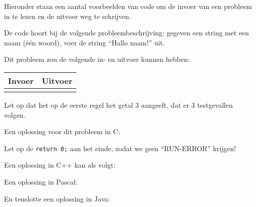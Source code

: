 \documentclass[11pt,titlepage,a4paper]{article}
\begin{document}
Hieronder staan een aantal voorbeelden van code om de invoer van een
probleem in te lezen en de uitvoer weg te schrijven.

De code hoort bij de volgende probleembeschrijving: gegeven een string
met een naam (\'e\'en woord), voer de string ``Hallo naam!'' uit.

Dit probleem zou de volgende in- en uitvoer kunnen hebben:

\begin{tabular}{|p{}|p{}|}
\hline
\textbf{Invoer} & \textbf{Uitvoer} \\
\hline
 &
 \\
\hline
\end{tabular}

Let op dat het op de eerste regel het getal 3 aangeeft, dat er 3
testgevallen volgen.

Een oplossing voor dit probleem in C:


Let op de \texttt{return 0;} aan het einde, zodat we geen
``RUN-ERROR'' krijgen!

Een oplossing in C++ kan als volgt:


Een oplossing in Pascal:


En tenslotte een oplossing in Java:

\end{document}
